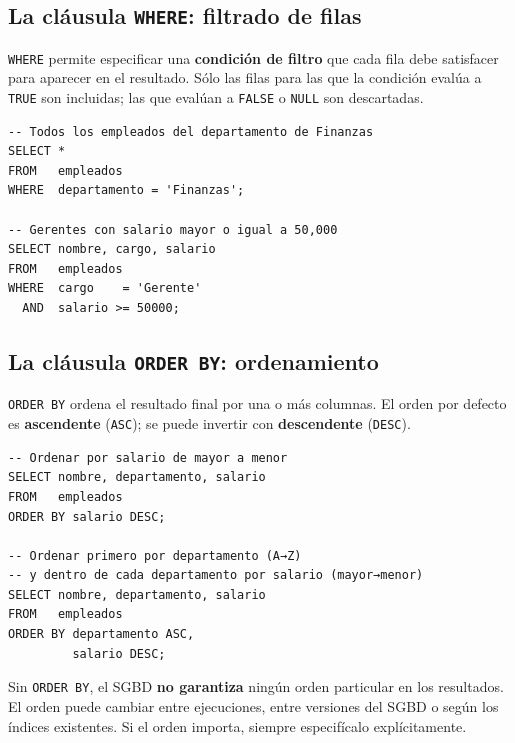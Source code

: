 \subsection{La cláusula \texttt{WHERE}: filtrado de filas}

\texttt{WHERE} permite especificar una \textbf{condición de filtro}
que cada fila debe satisfacer para aparecer en el resultado.
Sólo las filas para las que la condición evalúa a \texttt{TRUE}
son incluidas; las que evalúan a \texttt{FALSE} o \texttt{NULL}
son descartadas.

\begin{lstlisting}[caption={Uso básico de WHERE.}]
-- Todos los empleados del departamento de Finanzas
SELECT *
FROM   empleados
WHERE  departamento = 'Finanzas';

-- Gerentes con salario mayor o igual a 50,000
SELECT nombre, cargo, salario
FROM   empleados
WHERE  cargo    = 'Gerente'
  AND  salario >= 50000;
\end{lstlisting}

\subsection{La cláusula \texttt{ORDER BY}: ordenamiento}

\texttt{ORDER BY} ordena el resultado final por una o más columnas.
El orden por defecto es \textbf{ascendente} (\texttt{ASC});
se puede invertir con \textbf{descendente} (\texttt{DESC}).

\begin{lstlisting}[caption={Ordenamiento simple y compuesto.}]
-- Ordenar por salario de mayor a menor
SELECT nombre, departamento, salario
FROM   empleados
ORDER BY salario DESC;

-- Ordenar primero por departamento (A→Z)
-- y dentro de cada departamento por salario (mayor→menor)
SELECT nombre, departamento, salario
FROM   empleados
ORDER BY departamento ASC,
         salario DESC;
\end{lstlisting}

\begin{nota}
Sin \texttt{ORDER BY}, el SGBD \textbf{no garantiza} ningún orden
particular en los resultados. El orden puede cambiar entre
ejecuciones, entre versiones del SGBD o según los índices existentes.
Si el orden importa, siempre especifícalo explícitamente.
\end{nota}

